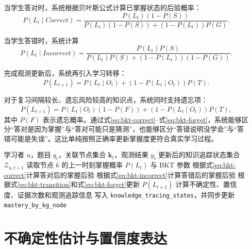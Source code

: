 当学生答对时，系统根据贝叶斯公式计算已掌握状态的后验概率：
\begin{equation}
  P(L_t\mid Correct)=
  \frac{P(L_t)(1-P(S))}
  {P(L_t)(1-P(S))+(1-P(L_t))P(G)}.
  \label{eq:bkt-correct}
\end{equation}

当学生答错时，系统计算
\begin{equation}
  P(L_t\mid Incorrect)=
  \frac{P(L_t)P(S)}
  {P(L_t)P(S)+(1-P(L_t))(1-P(G))}.
  \label{eq:bkt-incorrect}
\end{equation}

完成观测更新后，系统再引入学习转移：
\begin{equation}
  P(L_{t+1})=
  P(L_t\mid O_t)+
  \left(1-P(L_t\mid O_t)\right)P(T).
  \label{eq:bkt-transition}
\end{equation}

对于复习间隔较长、遗忘风险较高的知识点，系统同时支持遗忘项：
\begin{equation}
  P(L_{t+1})=
  P(L_t\mid O_t)(1-P(F))+
  \left(1-P(L_t\mid O_t)\right)P(T),
  \label{eq:bkt-forget}
\end{equation}
其中 $P(F)$ 表示遗忘概率。通过式\eqref{eq:bkt-correct}--式\eqref{eq:bkt-forget}，系统能够区分“答对是因为掌握”与“答对可能只是猜测”，也能够区分“答错说明没学会”与“答错可能是失误”。这比单纯按照正确率更新掌握度更符合真实学习过程。

\begin{algorithm}[H]
  \caption{面向 KG 节点的 BKT 后验更新}
  \label{alg:bkt-kg-node}
  \begin{algorithmic}[1]
    \Require 学习者 $u$，题目 $q_t$，关联节点集合 $\mathbf{k}_t$，观测结果 $y_t$
    \Ensure 更新后的知识追踪状态集合 $\mathcal{Z}_{u,t+1}$
      \State 读取节点 $k$ 的上一时刻掌握概率 $P(L_t)$ 与 BKT 参数
        \State 根据式\eqref{eq:bkt-correct}计算答对后的掌握后验
      \Else
        \State 根据式\eqref{eq:bkt-incorrect}计算答错后的掌握后验
      \EndIf
      \State 根据式\eqref{eq:bkt-transition}和式\eqref{eq:bkt-forget}更新 $P(L_{t+1})$
      \State 计算不确定性、置信度、证据次数和观测追踪信息
      \State 写入 \texttt{knowledge\_tracing\_states}，并同步更新 \texttt{mastery\_by\_kg\_node}
    \EndFor
  \end{algorithmic}
\end{algorithm}

\section{不确定性估计与置信度表达}

